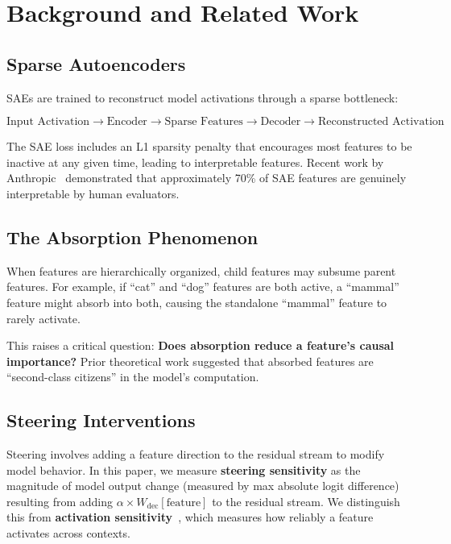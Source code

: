 \documentclass{article}
\begin{document}
\section{Background and Related Work}

\subsection{Sparse Autoencoders}

SAEs are trained to reconstruct model activations through a sparse bottleneck:

\begin{equation}
\text{Input Activation} \rightarrow \text{Encoder} \rightarrow \text{Sparse Features} \rightarrow \text{Decoder} \rightarrow \text{Reconstructed Activation}
\end{equation}

The SAE loss includes an L1 sparsity penalty that encourages most features to be inactive at any given time, leading to interpretable features. Recent work by Anthropic~\citep{anthropic2023towards} demonstrated that approximately 70\% of SAE features are genuinely interpretable by human evaluators.

\subsection{The Absorption Phenomenon}

When features are hierarchically organized, child features may subsume parent features. For example, if ``cat'' and ``dog'' features are both active, a ``mammal'' feature might absorb into both, causing the standalone ``mammal'' feature to rarely activate.

This raises a critical question: \textbf{Does absorption reduce a feature's causal importance?} Prior theoretical work suggested that absorbed features are ``second-class citizens'' in the model's computation.

\subsection{Steering Interventions}

Steering involves adding a feature direction to the residual stream to modify model behavior. In this paper, we measure \textbf{steering sensitivity} as the magnitude of model output change (measured by max absolute logit difference) resulting from adding $\alpha \times W_{\text{dec}}[\text{feature}]$ to the residual stream. We distinguish this from \textbf{activation sensitivity}~\citep{tian2025understanding}, which measures how reliably a feature activates across contexts.
\end{document}
